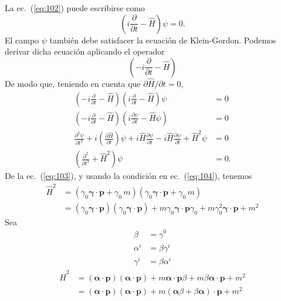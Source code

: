La ec.~(\ref{eq:102}) puede escribirse como
\begin{equation}
  \left(i\frac{\partial}{\partial t}-\hat{H}\right)\psi=0.
\end{equation}
El campo $\psi$ tambi\'en debe satisfacer la ecuaci\'on de Klein-Gordon. Podemos derivar dicha ecuaci\'on aplicando el operador
\begin{equation*}
  \left(-i\frac{\partial}{\partial t}-\hat{H}\right)
\end{equation*}
De modo que, teniendo en cuenta que $\partial\hat H/\partial t=0$,
\begin{align}
  \label{eq:105}
 \left(-i\frac{\partial}{\partial t}-\hat{H}\right)\left(i\frac{\partial}{\partial t}-\hat{H}\right)\psi&=0\nonumber\\
 \left(-i\frac{\partial}{\partial t}-\hat{H}\right)\left(i\frac{\partial\psi}{\partial t}-\hat{H}\psi\right)&=0\nonumber\\
 \frac{\partial^2\psi}{\partial t^2}+i\left(\frac{\partial\hat{H}}{\partial t}\right)\psi
 +i\hat{H}\frac{\partial\psi}{\partial t}-i\hat{H}\frac{\partial\psi}{\partial t}+\hat{H}^2\psi&=0\nonumber\\
 \left(\frac{\partial^2}{\partial t^2}+\hat{H}^2\right)\psi&=0.
\end{align}
% 
De la ec.~(\ref{eq:103}), y usando la condici\'on en ec.~(\ref{eq:104}), tenemos
\begin{align}
\label{eq:106}
\hat{H}^2&=(\gamma_0\boldsymbol{\gamma}\cdot\mathbf{p}+\gamma_0\,m)(\gamma_0\boldsymbol{\gamma}\cdot\mathbf{p}+\gamma_0\,m)\nonumber\\
&=(\gamma_0\boldsymbol{\gamma}\cdot\mathbf{p})(\gamma_0\boldsymbol{\gamma}\cdot\mathbf{p})+m\gamma_0\boldsymbol{\gamma}\cdot\mathbf{p}\gamma_0+m\gamma_0^2\boldsymbol{\gamma}\cdot\mathbf{p}+m^2
\end{align}
Sea
\begin{align}
  \beta&=\gamma^0\nonumber\\
  \alpha^i&=\beta\gamma^i\nonumber\\
  \gamma^i&=\beta\alpha^i
\end{align}
\begin{align}
  \hat{H}^2&=(\boldsymbol{\alpha}\cdot\mathbf{p})(\boldsymbol{\alpha}\cdot\mathbf{p})
  +m\boldsymbol{\alpha}\cdot\mathbf{p}\beta+m\beta\boldsymbol{\alpha}\cdot\mathbf{p}+m^2\nonumber\\
  &=(\boldsymbol{\alpha}\cdot\mathbf{p})(\boldsymbol{\alpha}\cdot\mathbf{p})
  +m(\boldsymbol{\alpha}\beta+\beta\boldsymbol{\alpha})\cdot\mathbf{p}+m^2
\end{align}
